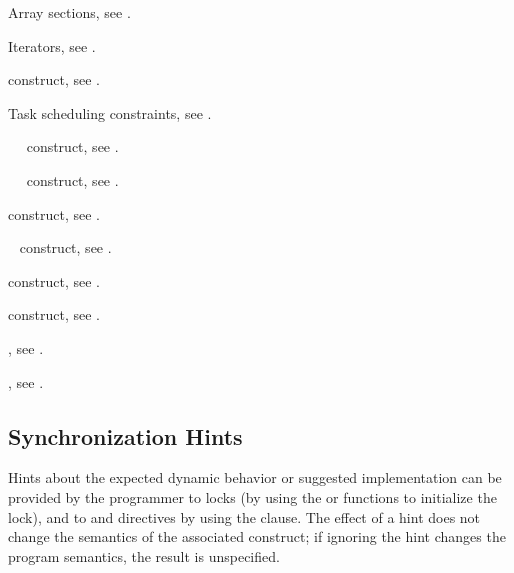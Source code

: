 \begin{crossrefs}
\item Array sections, see
.

\item Iterators, see .

\item {} construct, see
.

\item Task scheduling constraints, see .

\item {}~~ construct, see
.

\item {}~~ construct, see
.

\item {} construct, see
.

\item {}~ construct, see
.

\item {} construct, see
.

\item {} construct, see
.

\item {}, see
.

\item {}, see
.
\end{crossrefs}



\subsection{Synchronization Hints}
\label{subsec:Synchronization Hints}
Hints about the expected dynamic behavior or suggested implementation can be 
provided by the programmer to locks (by using the  
or  functions to initialize the lock), and to
 and  directives by using the  clause. The 
effect of a hint does not change the semantics of the associated construct; if 
ignoring the hint changes the program semantics, the result is unspecified.

